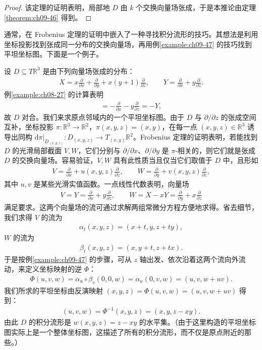 \documentclass[../../main.tex]{subfiles}
\begin{document}
\begin{proof}
该定理的证明表明，局部地 $D$ 由 $k$ 个交换向量场张成，于是本推论由定理\cref{theorem:ch09-46} 得到。
\end{proof}

通常，在 Frobenius 定理的证明中嵌入了一种寻找积分流形的技巧。其想法是利用坐标投影找到张成同一分布的交换向量场，再用例\cref{example:ch09-47} 的技巧找到平坦坐标图。下面是一个例子。

\begin{example}\label{example:ch19-frobenius-example}
设 $D\subseteq T\mathbb{R}^3$ 是由下列向量场张成的分布：
\begin{align*}
X=x\frac{\partial}{\partial x}+\frac{\partial}{\partial y}+x(y+1)\frac{\partial}{\partial z},\qquad
Y=\frac{\partial}{\partial x}+y\frac{\partial}{\partial z}.
\end{align*}
例\cref{example:ch08-27} 的计算表明
\begin{align*}
[X,Y]=-\frac{\partial}{\partial x}-y\frac{\partial}{\partial z}=-Y,
\end{align*}
故 $D$ 对合。我们来求原点邻域内的一个平坦坐标图。由于 $D$ 与 $\partial/\partial z$ 的张成空间互补，坐标投影 $\pi\colon\mathbb{R}^3\to\mathbb{R}^2$，$\pi(x,y,z)=(x,y)$，在每一点 $(x,y,z)\in\mathbb{R}^3$ 诱导出同构 $\mathrm{d}\pi|_{D_{(x,y,z)}}\colon D_{(x,y,z)}\to T_{(x,y)}\mathbb{R}^2$。Frobenius 定理的证明表明，若能找到 $D$ 的光滑局部截面 $V,W$，它们分别与 $\partial/\partial x$、$\partial/\partial y$ 是 $\pi$-相关的，则它们就是张成 $D$ 的交换向量场。容易验证，$V,W$ 具有此性质当且仅当它们取值于 $D$ 中，且形如
\begin{align*}
V=\frac{\partial}{\partial x}+u(x,y,z)\frac{\partial}{\partial z},\qquad
W=\frac{\partial}{\partial y}+v(x,y,z)\frac{\partial}{\partial z},
\end{align*}
其中 $u,v$ 是某些光滑实值函数。一点线性代数表明，向量场
\begin{align*}
V=Y=\frac{\partial}{\partial x}+y\frac{\partial}{\partial z},\qquad
W=X-xY=\frac{\partial}{\partial y}+x\frac{\partial}{\partial z}
\end{align*}
满足要求。这两个向量场的流可通过求解两组常微分方程方便地求得。省去细节，我们求得 $V$ 的流为
\begin{align}
\alpha_t(x,y,z)=(x+t,y,z+ty),
\end{align}
$W$ 的流为
\begin{align}
\beta_t(x,y,z)=(x,y+t,z+tx).
\end{align}
于是按例\cref{example:ch09-47} 的步骤，可从 $z$ 轴出发、依次沿着这两个流向外流动，来定义坐标映射的逆 $\Phi$：
\begin{align*}
\Phi(u,v,w)=\alpha_u\circ\beta_v(0,0,w)=\alpha_u(0,v,w)=(u,v,w+uv).
\end{align*}
我们所求的平坦坐标由反演映射 $(x,y,z)=\Phi(u,v,w)=(u,v,w+uv)$ 得到：
\begin{align*}
(u,v,w)=\Phi^{-1}(x,y,z)=(x,y,z-xy).
\end{align*}
由此 $D$ 的积分流形是 $w(x,y,z)=z-xy$ 的水平集。（由于这里构造的平坦坐标图实际上是一个整体坐标图，这描述了所有的积分流形，而不仅是原点附近的那些。）
\end{example}
\end{document}
